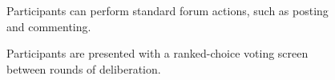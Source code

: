 \begin{figure}
\label{fig:reply}
\center
{}
\caption{Participants can perform standard forum actions, such as posting and commenting.}
\end{figure}

\begin{figure}
\label{fig:vote}
\center
{}
\caption{Participants are presented with a ranked-choice voting screen between rounds of deliberation.}
\end{figure}

